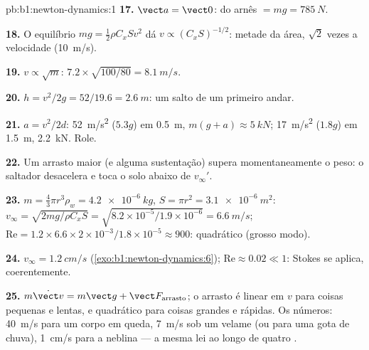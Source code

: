 \begin{solution}{pb:b1:newton-dynamics:1}
\textbf{17.} $\vect a = \vect 0$:  do arnês $= mg = \qty{785}{N}$.

\textbf{18.} O equilíbrio $mg = \tfrac12\rho C_xSv^2$ dá $v \propto (C_xS)^{-1/2}$:
metade da área, $\sqrt2$ vezes a velocidade (\qty{10}{m/s}).

\textbf{19.} $v \propto \sqrt m$: $7.2 \times \sqrt{100/80} = \qty{8.1}{m/s}$.

\textbf{20.} $h = v^2/2g = 52/19.6 = \qty{2.6}{m}$: um salto de um primeiro
andar.

\textbf{21.} $a = v^2/2d$: \qty{52}{m/s^2} ($5.3g$) em \qty{0.5}{m},
 $m(g + a) \approx \qty{5}{kN}$; \qty{17}{m/s^2} ($1.8g$) em
\qty{1.5}{m}, \qty{2.2}{kN}. Role.

\textbf{22.} Um arrasto maior (e alguma sustentação) supera momentaneamente o
peso: o saltador desacelera e toca o solo abaixo de $v_\infty'$.

\textbf{23.} $m = \tfrac43\pi r^3\rho_w = \qty{4.2e-6}{kg}$, $S = \pi r^2 =
\qty{3.1e-6}{m^2}$: $v_\infty = \sqrt{2mg/\rho C_xS} = \sqrt{8.2\times10^{-5}/
1.9\times10^{-6}} = \qty{6.6}{m/s}$; $\mathrm{Re} = 1.2 \times 6.6 \times
2\times10^{-3}/1.8\times10^{-5} \approx 900$: quadrático (grosso modo).

\textbf{24.} $v_\infty = \qty{1.2}{cm/s}$ (\cref{exo:b1:newton-dynamics:6});
$\mathrm{Re} \approx 0.02 \ll 1$: Stokes se aplica, coerentemente.

\textbf{25.} $m\dot{\vect v} = m\vect g + \vect F_{\text{arrasto}}$; o arrasto é linear
em $v$ para coisas pequenas e lentas, e quadrático para coisas grandes e rápidas. Os
números: \qty{40}{m/s} para um corpo em queda, \qty{7}{m/s} sob um velame
(ou para uma gota de chuva), \qty{1}{cm/s} para a neblina --- a mesma lei ao longo de quatro
.
\end{solution}

